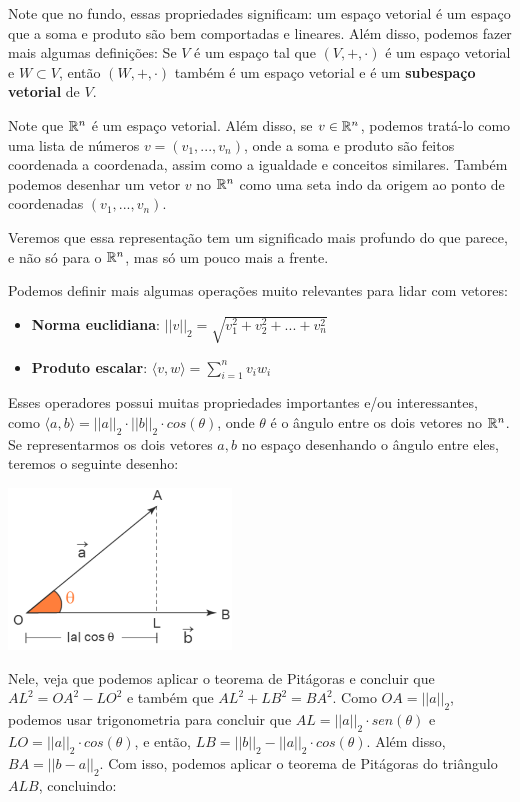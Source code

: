 \documentclass[11pt, a4paper]{article}
\begin{document}
Note que no fundo, essas propriedades significam: um espaço vetorial é um espaço que a soma e produto são bem comportadas e lineares. Além disso, podemos fazer mais algumas definições: Se \(V\) é um espaço tal que \((V,+,\cdot)\) é um espaço vetorial e \(W\subset V\), então \((W,+,\cdot)\) também é um espaço vetorial e é um \textbf{subespaço vetorial} de \(V\).

Note que \(\mathbb{R}^n\) é um espaço vetorial. Além disso, se \(v \in \mathbb{R}^n\), podemos tratá-lo como uma lista de números \(v=(v_1,...,v_n)\), onde a soma e produto são feitos coordenada a coordenada, assim como a igualdade e conceitos similares. Também podemos desenhar um vetor \(v\) no \(\mathbb{R}^n\) como uma seta indo da origem ao ponto de coordenadas \((v_1,...,v_n)\).

Veremos que essa representação tem um significado mais profundo do que parece, e não só para o \(\mathbb{R}^n\), mas só um pouco mais a frente.

Podemos definir mais algumas operações muito relevantes para lidar com vetores:

\begin{itemize}
    \item \textbf{Norma euclidiana}: \(||v||_2=\sqrt{v_1^2+v_2^2+...+v_n^2}\)
    \item \textbf{Produto escalar}: \( \displaystyle \langle v,w \rangle=\sum_{i=1}^{n}v_iw_i\)
\end{itemize}

Esses operadores possui muitas propriedades importantes e/ou interessantes, como \(\langle a,b\rangle =||a||_2\cdot ||b||_2 \cdot cos(\theta)\), onde \(\theta\) é o ângulo entre os dois vetores no \(\mathbb{R}^n\). Se representarmos os dois vetores \(a,b\) no espaço desenhando o ângulo entre eles, teremos o seguinte desenho:

\begin{center}
\includegraphics[width=16em]{Imagens/vectors.png}
\end{center}

Nele, veja que podemos aplicar o teorema de Pitágoras e concluir que \(AL^2=OA^2-LO^2\) e também que \(AL^2+LB^2=BA^2\). Como \(OA=||a||_2\), podemos usar trigonometria para concluir que \(AL=||a||_2 \cdot sen(\theta)\) e \(LO=||a||_2 \cdot cos(\theta)\), e então, \(LB=||b||_2 - ||a||_2 \cdot cos(\theta)\). Além disso, \(BA=||b-a||_2\). Com isso, podemos aplicar o teorema de Pitágoras do triângulo \(ALB\), concluindo:
\end{document}
